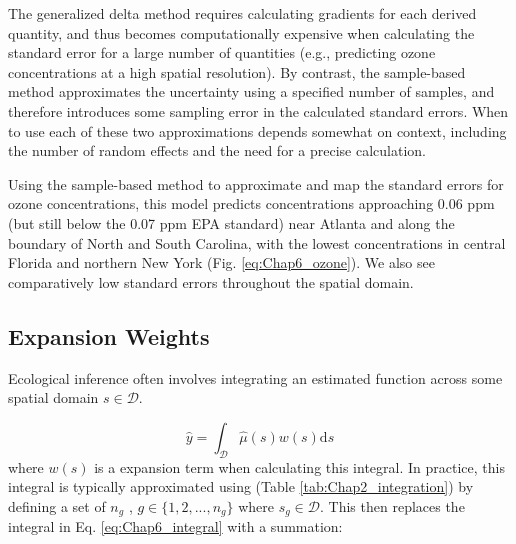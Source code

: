 The generalized delta method requires calculating gradients for each derived quantity, and thus becomes computationally expensive when calculating the standard error for a large number of quantities (e.g., predicting ozone concentrations at a high spatial resolution).  By contrast, the sample-based method approximates the uncertainty using a specified number of samples, and therefore introduces some sampling error in the calculated standard errors.  When to use each of these two approximations depends somewhat on context, including the number of random effects and the need for a precise calculation.  

\lstset{style=Rcode}


\lstset{style=Rcode}

    
\lstset{style=Rcode}


Using the sample-based method to approximate and map the standard errors for ozone concentrations, this model predicts concentrations approaching 0.06 ppm (but still below the 0.07 ppm EPA standard) near Atlanta and along the boundary of North and South Carolina, with the lowest concentrations in central Florida and northern New York (Fig. \ref{eq:Chap6_ozone}).  We also see comparatively low standard errors throughout the spatial domain.

\subsection{Expansion Weights} \label{sec:Chap6_expansion_weights}

Ecological inference often involves integrating an estimated function across some spatial domain \( s \in \mathcal{D} \).

\begin{equation} \label{eq:Chap6_integral}
    \hat{y} = \int_{\mathcal{D}} \hat\mu(s) w(s) \mathrm{d}s
\end{equation}
where \(w(s)\) is a expansion term when calculating this integral.  In practice, this integral is typically approximated using  \cite{wadoux_uncertainty_2023} (Table \ref{tab:Chap2_integration}) by defining a set of \(n_g\) , \( g \in \{1,2,...,n_g\}\) where \( s_g \in \mathcal{D}\).  This then replaces the integral in Eq. \ref{eq:Chap6_integral} with a summation:

